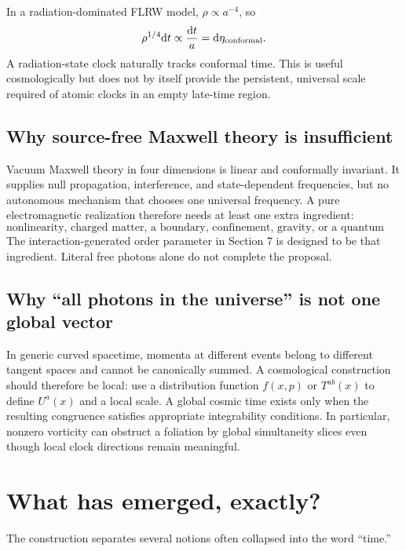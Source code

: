 \documentclass[11pt,a4paper]{article}
\newcommand{\dd}{\mathrm{d}}
\begin{document}
In a radiation-dominated FLRW model, $\rho\propto a^{-4}$, so
\[
\rho^{1/4}\dd t\propto\frac{\dd t}{a}=\dd\eta_{\rm conformal}.
\]
A radiation-state clock naturally tracks conformal time. This is useful cosmologically but does not by itself provide the persistent, universal scale required of atomic clocks in an empty late-time region.

\subsection{Why source-free Maxwell theory is insufficient}

Vacuum Maxwell theory in four dimensions is linear and conformally invariant. It supplies null propagation, interference, and state-dependent frequencies, but no autonomous mechanism that chooses one universal frequency. A pure electromagnetic realization therefore needs at least one extra ingredient:
\[
\text{nonlinearity, charged matter, a boundary, confinement, gravity, or a quantum anomaly.}
\]
The interaction-generated order parameter in Section 7 is designed to be that ingredient. Literal free photons alone do not complete the proposal.

\subsection{Why ``all photons in the universe'' is not one global vector}

In generic curved spacetime, momenta at different events belong to different tangent spaces and cannot be canonically summed. A cosmological construction should therefore be local: use a distribution function $f(x,p)$ or $T^{ab}(x)$ to define $U^a(x)$ and a local scale. A global cosmic time exists only when the resulting congruence satisfies appropriate integrability conditions. In particular, nonzero vorticity can obstruct a foliation by global simultaneity slices even though local clock directions remain meaningful.

\section{What has emerged, exactly?}

The construction separates several notions often collapsed into the word ``time.''
\end{document}
